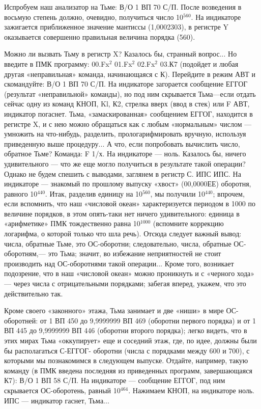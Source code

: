\documentclass[11pt,a4paper,oneside]{article}
\begin{document}
Испробуем наш анализатор на Тьме: В/О 1 ВП 70 С/П. После возведения в восьмую степень должно, очевидно, получиться число 10$^{560}$. На индикаторе зажигается приближенное значение мантиссы (1,0002303), в регистре Y оказывается совершенно правильная величина порядка (560).

Можно ли вызвать Тьму в регистр X? Казалось бы, странный вопрос... Но введите в ПМК программу: 00.Fx$^{2}$ 01.Fx$^{2}$ 02.Fx$^{2}$ 03.К7 (подойдет и любая другая «неправильная» команда, начинающаяся с К). Перейдите в режим АВТ и скомандуйте: В/О 1 ВП 70 С/П. На индикаторе загорается сообщение ЕГГОГ (результат «неправильной» команды), но под ним скрывается Тьма—если отдать сейчас одну из команд КНОП, Kl, К2, стрелка вверх (ввод в стек) или F АВТ, индикатор погаснет. Тьма, «замаскированная» сообщением ЕГГОГ, находится в регистре X, и с нею можно обращаться как с любым «нормальным» числом — умножить на что-нибудь, разделить, прологарифмировать вручную, используя приведенную выше процедуру... А что, если попробовать вычислить число, обратное Тьме? Команда: F 1/х. На индикаторе — ноль. Казалось бы, ничего удивительного — что же еще могло получиться в результате такой операции? Однако не будем спешить с выводами, заглянем в регистр С. ИПС ИПС. На индикаторе — знакомый по прошлому выпуску «хвост» (00,0000ЕЕ) оборотня, равного 10$^{440}$. Итак, разделив единицу на 10$^{560}$, мы получили 10$^{440}$; впрочем, если вспомнить, что наш «числовой океан» характеризуется периодом в 1000 по величине порядков, в этом опять-таки нет ничего удивительного: единица в «арифметике» ПМК тождественно равна 10$^{1000}$ (вспомните коррекцию логарифма, о которой только что шла речь). Отсюда следует важный вывод: числа, обратные Тьме, это ОС-оборотни; следовательно, числа, обратные ОС-оборотням,— это Тьма; значит, во избежание неприятностей не стоит производить над ОС-оборотнями такой операции... Кроме того, возникает подозрение, что в наш «числовой океан» можно проникнуть и с «черного хода» — через числа с отрицательными порядками; забегая вперед, укажем, что это действительно так.

Кроме своего «законного» этажа, Тьма занимает и две «ниши» в мире ОС-оборотней: от 1 ВП 450 до 9,9999999 ВП 469 (оборотни первого порядка) и от 1 ВП 445 до 9,9999999 ВП 446 (оборотни второго порядка); легко видеть, что в этих мирах Тьма «оккупирует» еще и соседний этаж, где, по идее, должны были бы располагаться С-ЕГГОГ- оборотни (числа с порядками между 600 и 700), с которыми мы познакомимся в следующем выпуске. Отдайте, например, такую команду (в ПМК введена последняя из приведенных программ, завершающаяся К7): В/О 1 ВП 58 С/П. На индикаторе — сообщение ЕГГОГ, под ним скрывается ОС-оборотень, равный 10$^{464}$. Нажимаем КНОП, на индикаторе ноль. ИПС — индикатор гаснет, Тьма...
\end{document}
